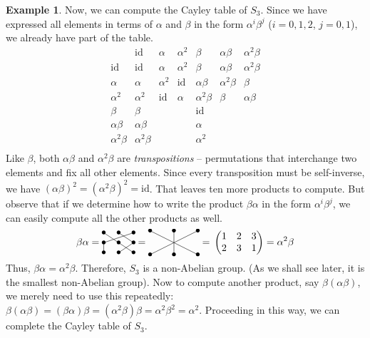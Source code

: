 \documentclass[svgnames]{article}
\theoremstyle{definition}
\newtheorem{Example}[Theorem]{Example}
\theoremstyle{remark}
\newcommand{\id}{\mathrm{id}}
\begin{document}
\begin{appendices}
\begin{Example}
Now, we can compute the Cayley table of $S_3$. Since we have expressed all elements in terms of $\alpha$ and $\beta$ in the form $\alpha^i \beta^j$ ($i = 0, 1, 2$, $j = 0, 1$), we already have part of the table.
\begin{equation*}
\begin{array}{r|cccccc}
		&	\id		&	\alpha	&	\alpha^2	&	\beta	&	\alpha\beta	&	\alpha^2\beta\\
\hline
\id		&	\id		&	\alpha	&	\alpha^2	&	\beta	&	\alpha\beta	&	\alpha^2\beta\\
\alpha	&	\alpha	&	\alpha^2	&	\id		&	\alpha\beta	&	\alpha^2\beta	&	\beta\\
\alpha^2&	\alpha^2	&	\id	&	\alpha		&	\alpha^2\beta	&	\beta	&	\alpha\beta\\
\beta	&	\beta	&			&				&	\id		&					&	\\
\alpha\beta	&	\alpha\beta	&		&			&	\alpha	&					&	\\	
\alpha^2\beta	&	\alpha^2\beta	&		&			&	\alpha^2	&		&	\\
\end{array}
\end{equation*}
Like $\beta$, both $\alpha\beta$ and $\alpha^2\beta$ are \emph{transpositions} -- permutations that interchange two elements and fix all other elements. Since every transposition must be self-inverse, we have $(\alpha\beta)^2 = (\alpha^2\beta)^2 = \id$. That leaves ten more products to compute. But observe that if we determine how to write the product $\beta\alpha$ in the form $\alpha^i \beta^j$, we can easily compute all the other products as well.
\begin{equation*}
\beta\alpha  = \,\vcenter{\xymatrix@R=1em@C=1.5em{
		*=0{\bullet} \ar@{-}[dr]	&	*=0{\bullet} \ar@{-}[dr]	&	*=0{\bullet} \ar@{-}[dll]\\
		*=0{\bullet} \ar@{-}[d]		&	*=0{\bullet} \ar@{-}[dr]	&	*=0{\bullet} \ar@{-}[dl]\\
		*=0{\bullet}				&	*=0{\bullet}				&	*=0{\bullet}\\		
}}\, = \,\vcenter{\xymatrix{
*=0{\bullet} \ar@{-}[drr]	&	*=0{\bullet} \ar@{-}[d]	&	*=0{\bullet} \ar@{-}[dll]\\
*=0{\bullet}				&	*=0{\bullet}				&	*=0{\bullet}\\
}}\, = \,\begin{pmatrix}
1 & 2 & 3\\
2 & 3 & 1
\end{pmatrix} = \alpha^2 \beta
\end{equation*}
Thus, $\beta\alpha = \alpha^2\beta$. Therefore, $S_3$ is a non-Abelian group. {\small (As we shall see later, it is the smallest non-Abelian group)}. Now to compute another product, say $\beta(\alpha\beta)$, we merely need to use this repeatedly: $\beta(\alpha\beta) = (\beta\alpha)\beta = (\alpha^2\beta)\beta = \alpha^2\beta^2 = \alpha^2$. Proceeding in this way, we can complete the Cayley table of $S_3$.

\end{Example}
\end{appendices}
\end{document}
